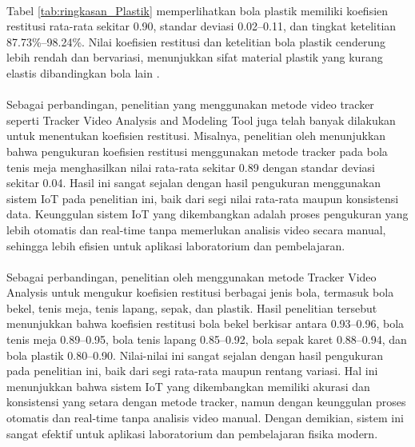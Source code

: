 

\paragraph{}Tabel \ref{tab:ringkasan_Plastik} memperlihatkan bola plastik memiliki koefisien restitusi rata-rata sekitar 0.90, standar deviasi 0.02--0.11, dan tingkat ketelitian 87.73\%--98.24\%. Nilai koefisien restitusi dan ketelitian bola plastik cenderung lebih rendah dan bervariasi, menunjukkan sifat material plastik yang kurang elastis dibandingkan bola lain \citep{garcia2021elastic}.

\paragraph{}Sebagai perbandingan, penelitian yang menggunakan metode video tracker seperti Tracker Video Analysis and Modeling Tool juga telah banyak dilakukan untuk menentukan koefisien restitusi. Misalnya, penelitian oleh \citep{putra2019tracker} menunjukkan bahwa pengukuran koefisien restitusi menggunakan metode tracker pada bola tenis meja menghasilkan nilai rata-rata sekitar 0.89 dengan standar deviasi sekitar 0.04. Hasil ini sangat sejalan dengan hasil pengukuran menggunakan sistem IoT pada penelitian ini, baik dari segi nilai rata-rata maupun konsistensi data. Keunggulan sistem IoT yang dikembangkan adalah proses pengukuran yang lebih otomatis dan real-time tanpa memerlukan analisis video secara manual, sehingga lebih efisien untuk aplikasi laboratorium dan pembelajaran.

\paragraph{}Sebagai perbandingan, penelitian oleh \citep{juita2020tracker} menggunakan metode Tracker Video Analysis untuk mengukur koefisien restitusi berbagai jenis bola, termasuk bola bekel, tenis meja, tenis lapang, sepak, dan plastik. Hasil penelitian tersebut menunjukkan bahwa koefisien restitusi bola bekel berkisar antara 0.93--0.96, bola tenis meja 0.89--0.95, bola tenis lapang 0.85--0.92, bola sepak karet 0.88--0.94, dan bola plastik 0.80--0.90. Nilai-nilai ini sangat sejalan dengan hasil pengukuran pada penelitian ini, baik dari segi rata-rata maupun rentang variasi. Hal ini menunjukkan bahwa sistem IoT yang dikembangkan memiliki akurasi dan konsistensi yang setara dengan metode tracker, namun dengan keunggulan proses otomatis dan real-time tanpa analisis video manual. Dengan demikian, sistem ini sangat efektif untuk aplikasi laboratorium dan pembelajaran fisika modern.

